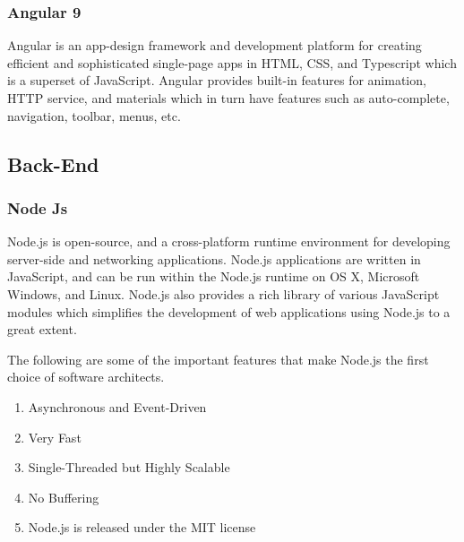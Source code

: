 \subsubsection{Angular 9}
Angular is an app-design framework and development platform for creating efficient and sophisticated single-page apps in \ac{HTML}, \ac{CSS}, and Typescript which is a superset of JavaScript. Angular provides built-in features for animation, \ac{HTTP} service, and materials which in turn have features such as auto-complete, navigation, toolbar, menus, etc.

\subsection{Back-End}

\subsubsection{Node Js}
Node.js is open-source, and a cross-platform runtime environment for developing server-side and networking applications. Node.js applications are written in JavaScript, and can be run within the Node.js runtime on OS X, Microsoft Windows, and Linux.
Node.js also provides a rich library of various JavaScript modules which simplifies the development of web applications using Node.js to a great extent.

The following are some of the important features that make Node.js the first choice of software architects.
\begin{enumerate}
      \item
            Asynchronous and Event-Driven
      \item
            Very Fast
      \item
            Single-Threaded but Highly Scalable
      \item
            No Buffering
      \item
            Node.js is released under the MIT license
\end{enumerate}



